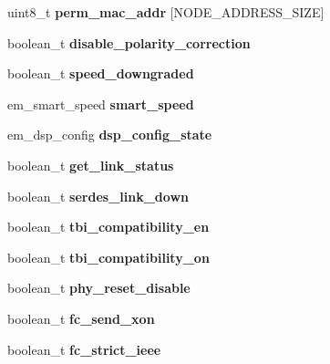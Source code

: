 \begin{DoxyCompactItemize}
uint8\+\_\+t {\bfseries perm\+\_\+mac\+\_\+addr} \mbox{[}N\+O\+D\+E\+\_\+\+A\+D\+D\+R\+E\+S\+S\+\_\+\+S\+I\+ZE\mbox{]}
\item 
\mbox{\label{structem__hw_ab60a9ee51f0565ba9fa99fc5c0b6e61b}} 
boolean\+\_\+t {\bfseries disable\+\_\+polarity\+\_\+correction}
\item 
\mbox{\label{structem__hw_a45b338f719874e0aab1e11f3fc76c62c}} 
boolean\+\_\+t {\bfseries speed\+\_\+downgraded}
\item 
\mbox{\label{structem__hw_adf98da6c72a27c0cc63a7d0366603471}} 
em\+\_\+smart\+\_\+speed {\bfseries smart\+\_\+speed}
\item 
\mbox{\label{structem__hw_aae825e08092e498ea1d2a1b076a1a21e}} 
em\+\_\+dsp\+\_\+config {\bfseries dsp\+\_\+config\+\_\+state}
\item 
\mbox{\label{structem__hw_af558d86eeaaf99b64e9cbe64bda28af5}} 
boolean\+\_\+t {\bfseries get\+\_\+link\+\_\+status}
\item 
\mbox{\label{structem__hw_a1b8a4f1c20c9c33ec3f5c83eb09b72f3}} 
boolean\+\_\+t {\bfseries serdes\+\_\+link\+\_\+down}
\item 
\mbox{\label{structem__hw_a7ac986bf998d7e3eab29793f48bc3dff}} 
boolean\+\_\+t {\bfseries tbi\+\_\+compatibility\+\_\+en}
\item 
\mbox{\label{structem__hw_a72c2ad59d8c8c175d36a0ef295e5e55f}} 
boolean\+\_\+t {\bfseries tbi\+\_\+compatibility\+\_\+on}
\item 
\mbox{\label{structem__hw_a8f33e6a7219548747b0c87faa02a34af}} 
boolean\+\_\+t {\bfseries phy\+\_\+reset\+\_\+disable}
\item 
\mbox{\label{structem__hw_a8aec31a2c29291eb91dd6fb9e0ac3b6f}} 
boolean\+\_\+t {\bfseries fc\+\_\+send\+\_\+xon}
\item 
\mbox{\label{structem__hw_aebd5182fd2d8482ee504822d46c095b5}} 
boolean\+\_\+t {\bfseries fc\+\_\+strict\+\_\+ieee}
\item 

\end{DoxyCompactItemize}
